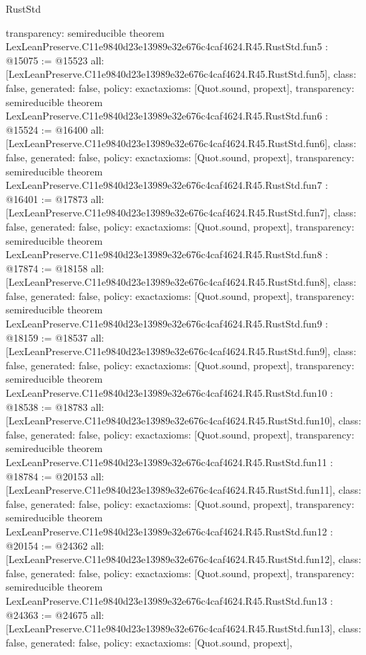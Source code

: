 \begin{lexlean}{RustStd}
\begin{coremodule}
{  transparency: semireducible
}
theorem LexLeanPreserve.C11e9840d23e13989e32e676c4caf4624.R45.RustStd.fun5 : @15075 := @15523 {
  all: [LexLeanPreserve.C11e9840d23e13989e32e676c4caf4624.R45.RustStd.fun5],
  class: false,
  generated: false,
  policy: exact{axioms: [Quot.sound, propext]},
  transparency: semireducible
}
theorem LexLeanPreserve.C11e9840d23e13989e32e676c4caf4624.R45.RustStd.fun6 : @15524 := @16400 {
  all: [LexLeanPreserve.C11e9840d23e13989e32e676c4caf4624.R45.RustStd.fun6],
  class: false,
  generated: false,
  policy: exact{axioms: [Quot.sound, propext]},
  transparency: semireducible
}
theorem LexLeanPreserve.C11e9840d23e13989e32e676c4caf4624.R45.RustStd.fun7 : @16401 := @17873 {
  all: [LexLeanPreserve.C11e9840d23e13989e32e676c4caf4624.R45.RustStd.fun7],
  class: false,
  generated: false,
  policy: exact{axioms: [Quot.sound, propext]},
  transparency: semireducible
}
theorem LexLeanPreserve.C11e9840d23e13989e32e676c4caf4624.R45.RustStd.fun8 : @17874 := @18158 {
  all: [LexLeanPreserve.C11e9840d23e13989e32e676c4caf4624.R45.RustStd.fun8],
  class: false,
  generated: false,
  policy: exact{axioms: [Quot.sound, propext]},
  transparency: semireducible
}
theorem LexLeanPreserve.C11e9840d23e13989e32e676c4caf4624.R45.RustStd.fun9 : @18159 := @18537 {
  all: [LexLeanPreserve.C11e9840d23e13989e32e676c4caf4624.R45.RustStd.fun9],
  class: false,
  generated: false,
  policy: exact{axioms: [Quot.sound, propext]},
  transparency: semireducible
}
theorem LexLeanPreserve.C11e9840d23e13989e32e676c4caf4624.R45.RustStd.fun10 : @18538 := @18783 {
  all: [LexLeanPreserve.C11e9840d23e13989e32e676c4caf4624.R45.RustStd.fun10],
  class: false,
  generated: false,
  policy: exact{axioms: [Quot.sound, propext]},
  transparency: semireducible
}
theorem LexLeanPreserve.C11e9840d23e13989e32e676c4caf4624.R45.RustStd.fun11 : @18784 := @20153 {
  all: [LexLeanPreserve.C11e9840d23e13989e32e676c4caf4624.R45.RustStd.fun11],
  class: false,
  generated: false,
  policy: exact{axioms: [Quot.sound, propext]},
  transparency: semireducible
}
theorem LexLeanPreserve.C11e9840d23e13989e32e676c4caf4624.R45.RustStd.fun12 : @20154 := @24362 {
  all: [LexLeanPreserve.C11e9840d23e13989e32e676c4caf4624.R45.RustStd.fun12],
  class: false,
  generated: false,
  policy: exact{axioms: [Quot.sound, propext]},
  transparency: semireducible
}
theorem LexLeanPreserve.C11e9840d23e13989e32e676c4caf4624.R45.RustStd.fun13 : @24363 := @24675 {
  all: [LexLeanPreserve.C11e9840d23e13989e32e676c4caf4624.R45.RustStd.fun13],
  class: false,
  generated: false,
  policy: exact{axioms: [Quot.sound, propext]},
}
\end{coremodule}
\end{lexlean}
